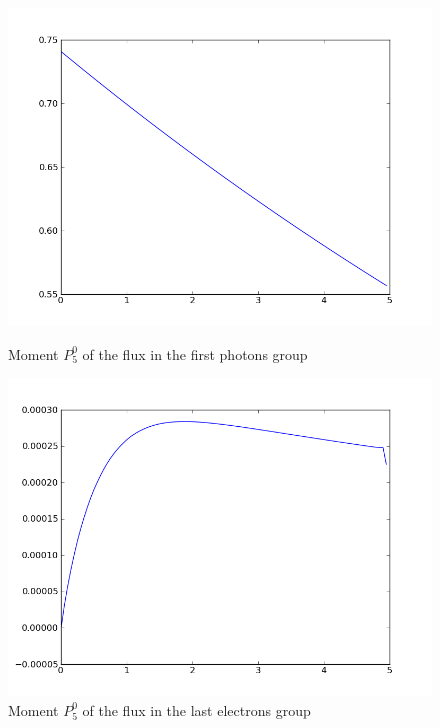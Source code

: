 \begin{figure}[H]
\begin{minipage}[b]{0.45\linewidth}
\centering
\includegraphics[width=\linewidth]{./images/al/group_0_moment_30}
\caption{Moment $P_5^0$ of the flux in the first photons group}
\end{minipage}
\hspace{0.5cm}
\begin{minipage}[b]{0.45\linewidth}
\centering
\includegraphics[width=\linewidth]{./images/al/group_39_moment_30}
\caption{Moment $P_5^0$ of the flux in the last electrons group}
\end{minipage}
\end{figure}

